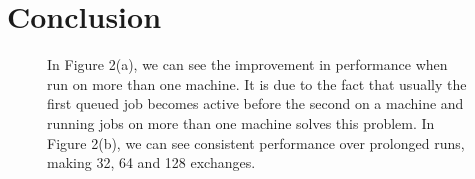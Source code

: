 \documentclass[a4paper,10pt]{article}
\newcommand{\athotanote}[1]{ {\textcolor{green} { ***athota: #1 }}}
\newcommand{\athotanote}[1]{}
\begin{document}
\section{Conclusion}







\begin{figure}
\centering
{}
\hspace{0.5cm}
\caption{\small In Figure 2(a), we can see the improvement in performance when run on more than one machine. It is due to the fact that usually the first queued job becomes active before the second on a machine and running jobs on more than one machine solves this problem. In Figure 2(b), we can see consistent performance over prolonged runs, making 32, 64 and 128 exchanges.}
\label{fig:graphs}
\end{figure}
\end{document}
